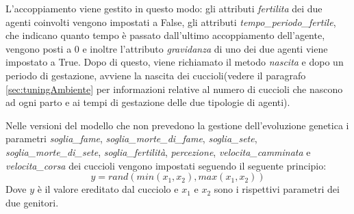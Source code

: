 \documentclass[11pt]{article}
\begin{document}
L'accoppiamento viene gestito in questo modo: gli attributi \emph{fertilita} dei due agenti coinvolti vengono impostati a False, gli attributi \emph{tempo\_periodo\_fertile}, che indicano quanto tempo è passato dall'ultimo accoppiamento dell'agente, vengono posti a 0 e inoltre l'attributo \emph{gravidanza} di uno dei due agenti viene impostato a True.
Dopo di questo, viene richiamato il metodo \emph{nascita} e dopo un periodo di gestazione, avviene la nascita  dei cuccioli(vedere il paragrafo \ref{sec:tuningAmbiente} per informazioni relative al numero di cuccioli che nascono ad ogni parto e ai tempi di gestazione delle due tipologie di agenti).

\newpage

Nelle versioni del modello che non prevedono la gestione dell'evoluzione genetica i parametri \emph{soglia\_fame}, \emph{soglia\_morte\_di\_fame}, \emph{soglia\_sete}, \emph{soglia\_morte\_di\_sete}, \emph{soglia\_fertilità}, \emph{percezione}, \emph{velocita\_camminata} e \emph{velocita\_corsa} dei cuccioli vengono impostati seguendo il seguente principio: 
\[
    y = rand(min(x_1, x_2), max(x_1, x_2))
\]
Dove $y$ è il valore ereditato dal cucciolo e $x_1$ e $x_2$ sono i rispettivi parametri dei due genitori.  
\end{document}

